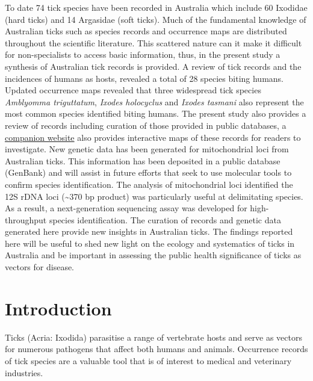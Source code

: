 \documentclass[a4paper, nobind]{templates/ociamthesis}
\begin{document}
To date 74 tick species have been recorded in Australia which include 60 Ixodidae (hard ticks) and 14 Argasidae (soft ticks).
Much of the fundamental knowledge of Australian ticks such as species records and occurrence maps are distributed throughout the scientific literature.
This scattered nature can it make it difficult for non-specialists to access basic information, thus, in the present study a synthesis of Australian tick records is provided.
A review of tick records and the incidences of humans as hosts, revealed a total of 28 species biting humans.
Updated occurrence maps revealed that three widespread tick species \emph{Amblyomma triguttatum}, \emph{Ixodes holocyclus} and \emph{Ixodes tasmani} also represent the most common species identified biting humans.
The present study also provides a review of records including curation of those provided in public databases, a \href{https://siobhonlegan.com/wildlife-ticks/}{companion website} also provides interactive maps of these records for readers to investigate.
New genetic data has been generated for mitochondrial loci from Australian ticks.
This information has been deposited in a public database (GenBank) and will assist in future efforts that seek to use molecular tools to confirm species identification.
The analysis of mitochondrial loci identified the 12S rDNA loci (\textasciitilde370 bp product) was particularly useful at delimitating species.
As a result, a next-generation sequencing assay was developed for high-throughput species identification.
The curation of records and genetic data generated here provide new insights in Australian ticks.
The findings reported here will be useful to shed new light on the ecology and systematics of ticks in Australia and be important in assessing the public health significance of ticks as vectors for disease.

\hypertarget{introduction}{%
\section{Introduction}\label{introduction}}

Ticks (Acria: Ixodida) parasitise a range of vertebrate hosts and serve as vectors for numerous pathogens that affect both humans and animals.
Occurrence records of tick species are a valuable tool that is of interest to medical and veterinary industries.
\end{document}
